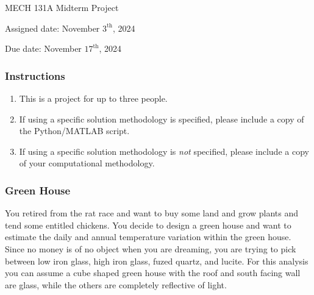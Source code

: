 \documentclass[12pt,letterpaper]{article}
\begin{document}
\noindent
MECH 131A Midterm Project

\noindent
Assigned date: November $3^{\mathrm{th}}$, 2024

\noindent
Due date: November $17^{\mathrm{th}}$, 2024

\subsubsection*{Instructions}
\begin{enumerate}
	\item This is a project for up to three people.
	\item If using a specific solution methodology is specified, please include a copy of the Python/MATLAB script.
	\item If using a specific solution methodology is \textit{not} specified, please include a copy of your computational methodology.
\end{enumerate}

\subsubsection*{Green House}

You retired from the rat race and want to buy some land and grow plants and tend some entitled chickens.
You decide to design a green house and want to estimate the daily and annual temperature variation within the green house.
Since no money is of no object when you are dreaming, you are trying to pick between low iron glass, high iron glass, fuzed quartz, and lucite.
For this analysis you can assume a cube shaped green house with the roof and south facing wall are glass, while the others are completely reflective of light.
\end{document}
